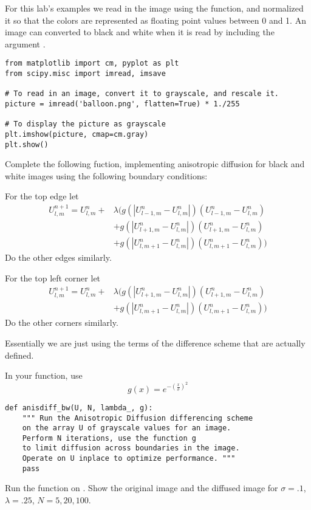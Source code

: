 For this lab's examples we read in the image using the  function, and normalized it so that the colors are represented as floating point values between 0 and 1.
An image can converted to black and white when it is read by including the argument .

\begin{lstlisting}
from matplotlib import cm, pyplot as plt
from scipy.misc import imread, imsave

# To read in an image, convert it to grayscale, and rescale it.
picture = imread('balloon.png', flatten=True) * 1./255

# To display the picture as grayscale
plt.imshow(picture, cmap=cm.gray)
plt.show()
\end{lstlisting}

\begin{problem}
\label{prob:anisdiff_bw}
Complete the following fuction, implementing anisotropic diffusion for black and white images using the following boundary conditions:

For the top edge let
\begin{align*}
U_{l,m}^{n+1} = U_{l,m}^n + & \lambda (g(|U_{l-1,m}^n - U_{l,m}^n|)(U_{l-1,m}^n - U_{l,m}^n) \\
					& + g(|U_{l+1,m}^n - U_{l,m}^n|)(U_{l+1,m}^n - U_{l,m}^n) \\
					& + g(|U_{l,m+1}^n - U_{l,m}^n|)(U_{l,m+1}^n - U_{l,m}^n))
\end{align*}
Do the other edges similarly.

For the top left corner let
\begin{align*}
U_{l,m}^{n+1} = U_{l,m}^n + & \lambda (g(|U_{l+1,m}^n - U_{l,m}^n|)(U_{l+1,m}^n - U_{l,m}^n) \\
					& + g(|U_{l,m+1}^n - U_{l,m}^n|)(U_{l,m+1}^n - U_{l,m}^n))
\end{align*}
Do the other corners similarly.

Essentially we are just using the terms of the difference scheme that are actually defined.

In your function, use
\[g(x) = e^{-\left(\frac{x}{\sigma}\right)^2}\]

\begin{lstlisting}
def anisdiff_bw(U, N, lambda_, g):
    """ Run the Anisotropic Diffusion differencing scheme
    on the array U of grayscale values for an image.
    Perform N iterations, use the function g
    to limit diffusion across boundaries in the image.
    Operate on U inplace to optimize performance. """
    pass
\end{lstlisting}
Run the function on .
Show the original image and the diffused image for $\sigma = .1$, $\lambda = .25$, $N = 5, 20, 100$.


\end{problem}

